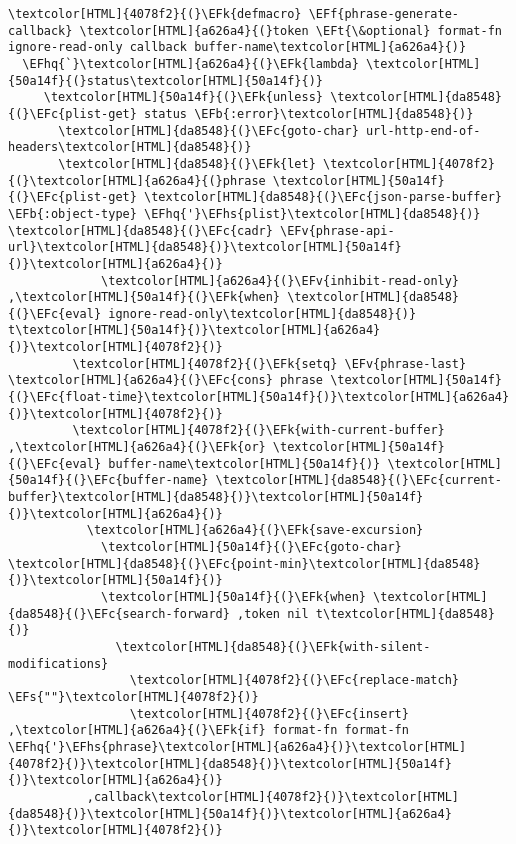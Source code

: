 \documentclass{scrartcl}
\newcommand{\EFk}[1]{\textcolor{EFk}{#1}} %
\newcommand{\EFt}[1]{\textcolor{EFt}{#1}} %
\newcommand{\EFs}[1]{\textcolor{EFs}{#1}} %
\newcommand{\EFb}[1]{\textcolor{EFb}{#1}} %
\newcommand{\EFc}[1]{\textcolor{EFc}{#1}} %
\newcommand{\EFv}[1]{\textcolor{EFv}{#1}} %
\newcommand{\EFf}[1]{\textcolor{EFf}{#1}} %
\newcommand{\EFhq}[1]{\textcolor{EFhq}{#1}} %
\newcommand{\EFhs}[1]{\textcolor{EFhs}{#1}} %
\begin{document}
\begin{Code}
\begin{Verbatim}[]
\textcolor[HTML]{4078f2}{(}\EFk{defmacro} \EFf{phrase-generate-callback} \textcolor[HTML]{a626a4}{(}token \EFt{\&optional} format-fn ignore-read-only callback buffer-name\textcolor[HTML]{a626a4}{)}
  \EFhq{`}\textcolor[HTML]{a626a4}{(}\EFk{lambda} \textcolor[HTML]{50a14f}{(}status\textcolor[HTML]{50a14f}{)}
     \textcolor[HTML]{50a14f}{(}\EFk{unless} \textcolor[HTML]{da8548}{(}\EFc{plist-get} status \EFb{:error}\textcolor[HTML]{da8548}{)}
       \textcolor[HTML]{da8548}{(}\EFc{goto-char} url-http-end-of-headers\textcolor[HTML]{da8548}{)}
       \textcolor[HTML]{da8548}{(}\EFk{let} \textcolor[HTML]{4078f2}{(}\textcolor[HTML]{a626a4}{(}phrase \textcolor[HTML]{50a14f}{(}\EFc{plist-get} \textcolor[HTML]{da8548}{(}\EFc{json-parse-buffer} \EFb{:object-type} \EFhq{'}\EFhs{plist}\textcolor[HTML]{da8548}{)} \textcolor[HTML]{da8548}{(}\EFc{cadr} \EFv{phrase-api-url}\textcolor[HTML]{da8548}{)}\textcolor[HTML]{50a14f}{)}\textcolor[HTML]{a626a4}{)}
             \textcolor[HTML]{a626a4}{(}\EFv{inhibit-read-only} ,\textcolor[HTML]{50a14f}{(}\EFk{when} \textcolor[HTML]{da8548}{(}\EFc{eval} ignore-read-only\textcolor[HTML]{da8548}{)} t\textcolor[HTML]{50a14f}{)}\textcolor[HTML]{a626a4}{)}\textcolor[HTML]{4078f2}{)}
         \textcolor[HTML]{4078f2}{(}\EFk{setq} \EFv{phrase-last} \textcolor[HTML]{a626a4}{(}\EFc{cons} phrase \textcolor[HTML]{50a14f}{(}\EFc{float-time}\textcolor[HTML]{50a14f}{)}\textcolor[HTML]{a626a4}{)}\textcolor[HTML]{4078f2}{)}
         \textcolor[HTML]{4078f2}{(}\EFk{with-current-buffer} ,\textcolor[HTML]{a626a4}{(}\EFk{or} \textcolor[HTML]{50a14f}{(}\EFc{eval} buffer-name\textcolor[HTML]{50a14f}{)} \textcolor[HTML]{50a14f}{(}\EFc{buffer-name} \textcolor[HTML]{da8548}{(}\EFc{current-buffer}\textcolor[HTML]{da8548}{)}\textcolor[HTML]{50a14f}{)}\textcolor[HTML]{a626a4}{)}
           \textcolor[HTML]{a626a4}{(}\EFk{save-excursion}
             \textcolor[HTML]{50a14f}{(}\EFc{goto-char} \textcolor[HTML]{da8548}{(}\EFc{point-min}\textcolor[HTML]{da8548}{)}\textcolor[HTML]{50a14f}{)}
             \textcolor[HTML]{50a14f}{(}\EFk{when} \textcolor[HTML]{da8548}{(}\EFc{search-forward} ,token nil t\textcolor[HTML]{da8548}{)}
               \textcolor[HTML]{da8548}{(}\EFk{with-silent-modifications}
                 \textcolor[HTML]{4078f2}{(}\EFc{replace-match} \EFs{""}\textcolor[HTML]{4078f2}{)}
                 \textcolor[HTML]{4078f2}{(}\EFc{insert} ,\textcolor[HTML]{a626a4}{(}\EFk{if} format-fn format-fn \EFhq{'}\EFhs{phrase}\textcolor[HTML]{a626a4}{)}\textcolor[HTML]{4078f2}{)}\textcolor[HTML]{da8548}{)}\textcolor[HTML]{50a14f}{)}\textcolor[HTML]{a626a4}{)}
           ,callback\textcolor[HTML]{4078f2}{)}\textcolor[HTML]{da8548}{)}\textcolor[HTML]{50a14f}{)}\textcolor[HTML]{a626a4}{)}\textcolor[HTML]{4078f2}{)}


\end{Verbatim}
\end{Code}
\end{document}
